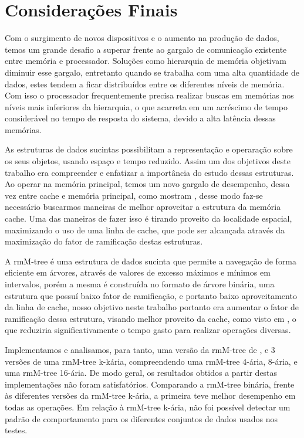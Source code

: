 \chapter{Considerações Finais}\label{chp:conclusao}

Com o surgimento de novos dispositivos e o aumento na produção de dados, temos um grande desafio a superar frente ao gargalo de comunicação existente entre memória e processador. Soluções como hierarquia de memória objetivam diminuir esse gargalo, entretanto quando se trabalha com uma alta quantidade de dados, estes tendem a ficar distribuídos entre os diferentes níveis de memória. Com isso o processador frequentemente precisa realizar buscas em memórias  nos níveis mais inferiores da hierarquia, o que acarreta em um acréscimo de tempo considerável no tempo de resposta do sistema, devido a alta latência dessas memórias.

As estruturas de dados sucintas possibilitam a representação e operaração sobre os seus objetos, usando espaço e tempo reduzido. Assim um dos objetivos deste trabalho era compreender e enfatizar a importância do estudo dessas estruturas. Ao operar na memória principal, temos um novo gargalo de desempenho, dessa vez entre cache e memória principal, como mostram \citet{paper-making-btree-cache}, desse modo faz-se necessário buscarmos maneiras de melhor aproveitar a estrutura da memória cache. Uma das maneiras de fazer isso é tirando proveito da localidade espacial, maximizando o uso de uma linha de cache, que pode ser alcançada através da maximização do fator de ramificação destas estruturas. 

A rmM-tree é uma estrutura de dados sucinta que permite a navegação de forma eficiente em árvores, através de valores de excesso máximos e mínimos em intervalos, porém a mesma é construída no formato de árvore binária, uma estrutura que possuí baixo fator de ramificação, e portanto baixo aproveitamento da linha de cache, nosso objetivo neste trabalho portanto era aumentar o fator de ramificação dessa estrutura, visando  melhor proveito da cache, como visto em \citet{paper-making-btree-cache}, o que reduziria significativamente o tempo gasto para realizar operações diversas. 

Implementamos e analisamos, para tanto, uma versão da rmM-tree de \citet{book-compact-data-structures}, e 3 versões de uma rmM-tree k-kária, compreendendo uma rmM-tree 4-ária, 8-ária, e uma rmM-tree 16-ária. De modo geral, os resultados obtidos a partir destas implementações não foram satisfatórios. Comparando a rmM-tree binária, frente às diferentes versões da rmM-tree k-ária, a primeira teve melhor desempenho em todas as operações. Em relação à rmM-tree k-ária, não foi possível detectar um padrão de comportamento para os diferentes conjuntos de dados usados nos testes. 

